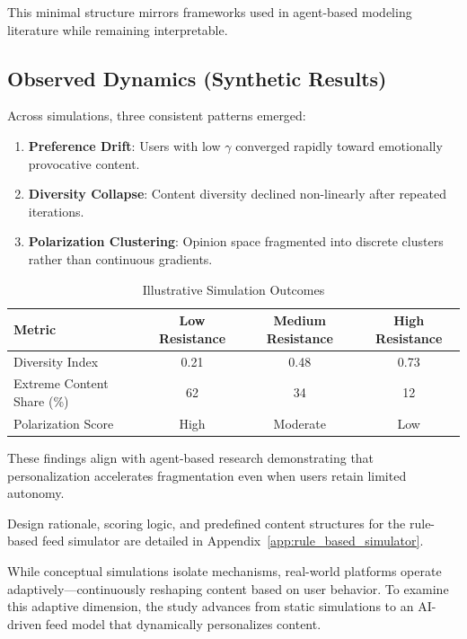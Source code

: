 \documentclass[12pt,a4paper]{report}
\begin{document}
This minimal structure mirrors frameworks used in agent-based modeling literature while remaining interpretable.

\subsection{Observed Dynamics (Synthetic Results)}

Across simulations, three consistent patterns emerged:

\begin{enumerate}
  \item \textbf{Preference Drift}: Users with low $\gamma$ converged rapidly toward emotionally provocative content.
  \item \textbf{Diversity Collapse}: Content diversity declined non-linearly after repeated iterations.
  \item \textbf{Polarization Clustering}: Opinion space fragmented into discrete clusters rather than continuous gradients.
\end{enumerate}

\begin{table}[H]
  \centering
    \caption{Illustrative Simulation Outcomes}
  \begin{tabularx}{\textwidth}{@{} X ccc @{}}
    \toprule
    \textbf{Metric} & \textbf{Low Resistance} & \textbf{Medium Resistance} & \textbf{High Resistance} \\
    \midrule
    Diversity Index & 0.21 & 0.48 & 0.73 \\
    Extreme Content Share (\%) & 62 & 34 & 12 \\
    Polarization Score & High & Moderate & Low \\
    \bottomrule
  \end{tabularx}

\end{table}

These findings align with agent-based research demonstrating that personalization accelerates fragmentation even when users retain limited autonomy. 

Design rationale, scoring logic, and predefined content structures for the rule-based feed simulator are detailed in Appendix~\ref{app:rule_based_simulator}.

While conceptual simulations isolate mechanisms, real-world platforms operate adaptively—continuously reshaping content based on user behavior. To examine this adaptive dimension, the study advances from static simulations to an AI-driven feed model that dynamically personalizes content.
\end{document}
